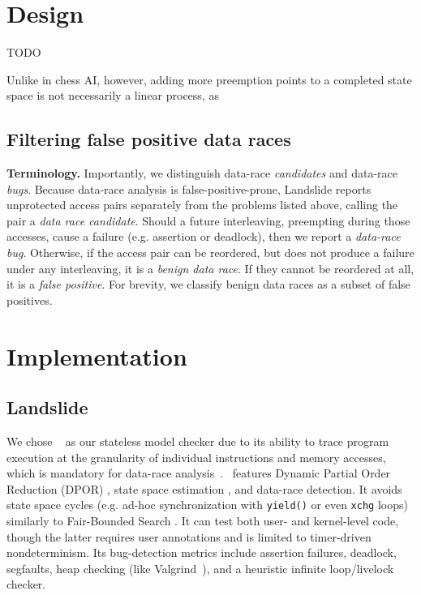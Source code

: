 \section{Design}

TODO

Unlike in chess AI, however, adding more preemption points to a completed state space is not necessarily a linear process, as  %



\subsection{Filtering false positive data races}

{\bf Terminology.}
Importantly, we distinguish data-race {\em candidates} and data-race {\em bugs}.
Because data-race analysis is false-positive-prone, Landslide reports unprotected access pairs separately from the problems listed above, calling the pair a {\em data race candidate}.
Should a future interleaving, preempting during those accesses, cause a failure (e.g. assertion or deadlock), then we report a {\em data-race bug}.
Otherwise, if the access pair can be reordered, but does not produce a failure under any interleaving, it is a {\em benign data race}.
If they cannot be reordered at all, it is a {\em false positive}.
For brevity, we classify benign data races as a subset of false positives.




\section{Implementation}

\subsection{Landslide}
\label{sec:landslide}

We chose \landslide~\cite{landslide} as our stateless model checker due to its ability to trace program execution at the granularity of individual instructions and memory accesses, which is mandatory for data-race analysis~\cite{eraser}.
\landslide~features Dynamic Partial Order Reduction (DPOR) \cite{dpor}, state space estimation \cite{estimation}, and data-race detection.
It avoids state space cycles (e.g. ad-hoc synchronization with {\tt yield()} or even {\tt xchg} loops) similarly to Fair-Bounded Search \cite{bpor}.
It can test both user- and kernel-level code, though the latter requires user annotations and is limited to timer-driven nondeterminism.
Its bug-detection metrics include assertion failures, deadlock, segfaults, heap checking (like Valgrind~\cite{valgrind}), and a heuristic infinite loop/livelock checker.


